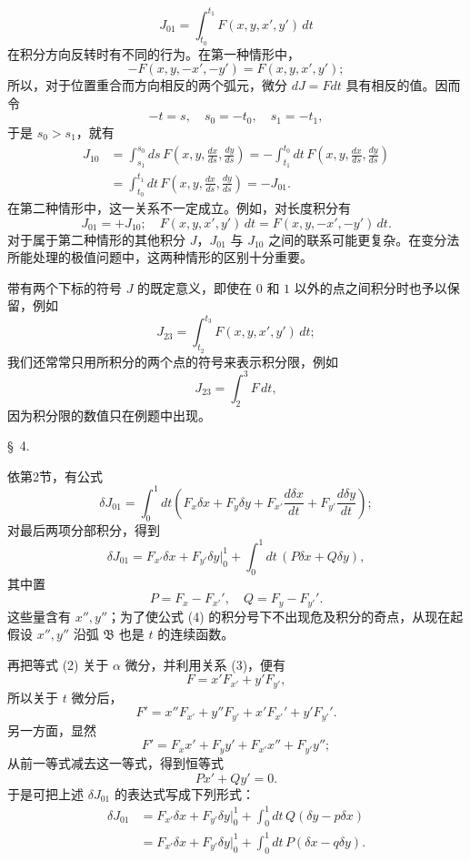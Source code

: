 \documentclass[11pt,a4paper,leqno]{article}
\begin{document}
\[
 J_{01}=\int_{t_0}^{t_1}F(x,y,x',y')\,dt
\]
在积分方向反转时有不同的行为。在第一种情形中，
\[
 -F(x,y,-x',-y')=F(x,y,x',y');
\]
所以，对于位置重合而方向相反的两个弧元，微分 $dJ=Fdt$ 具有相反的值。因而令
\[
 -t=s,\quad s_0=-t_0,\quad s_1=-t_1,
\]
于是 $s_0>s_1$，就有
\[
\begin{aligned}
 J_{10}
 &=\int_{s_1}^{s_0}ds\,F\left(x,y,\frac{dx}{ds},\frac{dy}{ds}\right)
 =-\int_{t_1}^{t_0}dt\,F\left(x,y,\frac{dx}{ds},\frac{dy}{ds}\right)\\
 &=\int_{t_0}^{t_1}dt\,F\left(x,y,\frac{dx}{ds},\frac{dy}{ds}\right)=-J_{01}.
\end{aligned}
\]
在第二种情形中，这一关系不一定成立。例如，对长度积分有
\[
 J_{01}=+J_{10};\quad F(x,y,x',y')\,dt=F(x,y,-x',-y')\,dt.
\]
对于属于第二种情形的其他积分 $J$，$J_{01}$ 与 $J_{10}$ 之间的联系可能更复杂。在变分法所能处理的极值问题中，这两种情形的区别十分重要。

带有两个下标的符号 $J$ 的既定意义，即使在 $0$ 和 $1$ 以外的点之间积分时也予以保留，例如
\[
 J_{23}=\int_{t_2}^{t_3}F(x,y,x',y')\,dt;
\]
我们还常常只用所积分的两个点的符号来表示积分限，例如
\[
 J_{23}=\int_2^3 F\,dt,
\]
因为积分限的数值只在例题中出现。

\begin{center}
\S~4.
\end{center}

依第2节，有公式
\[
\delta J_{01}=\int_0^1 dt\left(F_x\delta x+F_y\delta y+F_{x'}\frac{d\delta x}{dt}+F_{y'}\frac{d\delta y}{dt}\right);
\]
对最后两项分部积分，得到
\[
\tag{4}
\delta J_{01}=F_{x'}\delta x+F_{y'}\delta y\bigg|_0^1+\int_0^1dt\,(P\delta x+Q\delta y),
\]
其中置
\[
P=F_x-F_{x'}',\quad Q=F_y-F_{y'}'.
\]
这些量含有 \(x'',y''\)；为了使公式 (4) 的积分号下不出现危及积分的奇点，从现在起假设 \(x'',y''\) 沿弧 \(\mathfrak B\) 也是 \(t\) 的连续函数。

再把等式 (2) 关于 \(\alpha\) 微分，并利用关系 (3)，便有
\[
F=x'F_{x'}+y'F_{y'},
\]
所以关于 \(t\) 微分后，
\[
F'=x''F_{x'}+y''F_{y'}+x'F_{x'}'+y'F_{y'}'.
\]
另一方面，显然
\[
F'=F_xx'+F_yy'+F_{x'}x''+F_{y'}y'';
\]
从前一等式减去这一等式，得到恒等式
\[
\tag{5}
Px'+Qy'=0.
\]
于是可把上述 \(\delta J_{01}\) 的表达式写成下列形式：
\[
\tag{6}
\begin{aligned}
\delta J_{01}
&=F_{x'}\delta x+F_{y'}\delta y\bigg|_0^1+\int_0^1dt\,Q(\delta y-p\delta x)\\
&=F_{x'}\delta x+F_{y'}\delta y\bigg|_0^1+\int_0^1dt\,P(\delta x-q\delta y).
\end{aligned}
\]
\end{document}
